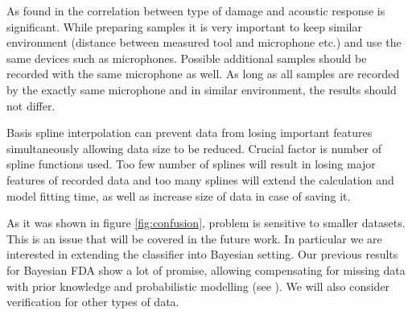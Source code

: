 \documentclass[energies,article,submit,pdftex,moreauthors]{Definitions/mdpi}
\begin{document}
As found in \cite{ref-motors} the correlation between type of damage and acoustic response is significant. While preparing samples it is very important to keep similar environment (distance between measured tool and microphone etc.) and use the same devices such as microphones. Possible additional samples should be recorded with the same microphone as well. As long as all samples are recorded by the exactly same microphone and in similar environment, the results should not differ.

Basis spline interpolation can prevent  data from losing important features simultaneously allowing data size to be reduced. Crucial factor is number of spline functions used. Too few number of splines will result in losing major features of recorded data and too many splines will extend the calculation and model fitting time, as well as increase size of data in case of saving it.

As it was shown in figure \ref{fig:confusion}, problem is sensitive to smaller datasets. This is an issue that will be covered in the future work. In particular we are interested in extending the classifier into Bayesian setting. Our previous results for Bayesian FDA show a lot of promise, allowing compensating for missing data with prior knowledge and probabilistic modelling (see \cite{en14185893}). We will also consider verification for other types of data.


\vspace{6pt} 



\end{document}
